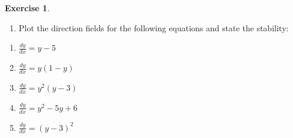 \documentclass[
]{book}
\providecommand{\tightlist}{%
  \setlength{\itemsep}{0pt}\setlength{\parskip}{0pt}}
\theoremstyle{definition}
\theoremstyle{definition}
\theoremstyle{definition}
\newtheorem{exercise}{Exercise}[chapter]
\theoremstyle{definition}
\theoremstyle{remark}
\begin{document}
\begin{exercise}
\protect\hypertarget{exr:unnamed-chunk-41}{}\label{exr:unnamed-chunk-41}\leavevmode

\begin{enumerate}
\def\labelenumi{\arabic{enumi}.}
\setcounter{enumi}{1}
\tightlist
\item
  Plot the direction fields for the following equations and state the stability:
\end{enumerate}

\begin{enumerate}
\def\labelenumi{(\roman{enumi})}
\tightlist
\item
  \(\frac{dy}{dx} = y - 5\)
\item
  \(\frac{dy}{dx} = y(1 - y)\)
\item
  \(\frac{dy}{dx} = y^2(y - 3)\)
\item
  \(\frac{dy}{dx} = y^2 - 5y + 6\)
\item
  \(\frac{dy}{dx} = (y - 3)^2\)
\end{enumerate}

\end{exercise}

  
\end{document}
